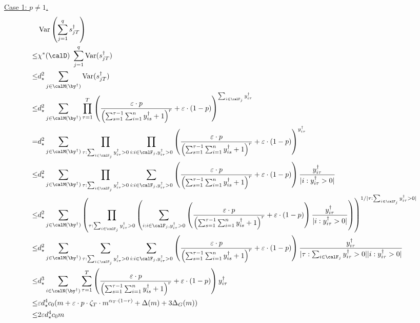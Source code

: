\documentclass[blindrev]{informs3noheader}
\DeclareMathOperator{\Var}{Var}
\begin{document}
\underline{Case 1: $p\neq 1$.}
\begin{align*}
&\Var\left(\sum_{j=1}^q s^\dagger_{jT}\right)
\\\leq & \chi^*(\calD)\ \sum_{j=1}^q \Var(s^\dagger_{jT})
\\\leq & d_\star^2 \sum_{j \in \calM(\by^\dagger)} \Var(s^\dagger_{jT})
\\\leq & d_\star^2\sum_{j \in \calM(\by^\dagger)}  \prod_{\tau=1}^T \left(\frac{\varepsilon\cdot p}{\left(\sum_{s=1}^{\tau-1} \sum_{i=1}^n y^\dagger_{is} + 1\right)^r}+\varepsilon\cdot(1-p)\right)^{\sum_{i \in \calF_j} y^\dagger_{i\tau}}
\\= & d_\star^2\sum_{j \in \calM(\by^\dagger)}  \prod_{\tau:\sum_{i \in \calF_j} y^\dagger_{i\tau}>0 }  \prod_{i:i \in \calF_j, y^\dagger_{i\tau}>0 }  \left(\frac{\varepsilon\cdot p}{\left(\sum_{s=1}^{\tau-1} \sum_{i=1}^n y^\dagger_{is} + 1\right)^r}+\varepsilon\cdot(1-p)\right)^{ y^\dagger_{i\tau}}    
\\\leq & d_\star^2\sum_{j \in \calM(\by^\dagger)}  \prod_{\tau:\sum_{i \in \calF_j} y^\dagger_{i\tau}>0 } \sum_{i: i \in \calF_j,  y^\dagger_{i\tau}>0} \left(\frac{\varepsilon\cdot p}{\left(\sum_{s=1}^{\tau-1} \sum_{i=1}^n y^\dagger_{is} + 1\right)^r}+\varepsilon\cdot(1-p)\right)\frac{y^\dagger_{i\tau}}{|i:  y^\dagger_{i\tau}>0|}
\\\leq & d_\star^2\sum_{j \in \calM(\by^\dagger)}  \left(\prod_{\tau:\sum_{i \in \calF_j} y^\dagger_{i\tau}>0 } \left(\sum_{i: i \in \calF_j,  y^\dagger_{i\tau}>0} \left(\frac{\varepsilon\cdot p}{\left(\sum_{s=1}^{\tau-1} \sum_{i=1}^n y^\dagger_{is} + 1\right)^r}+\varepsilon\cdot(1-p)\right)\frac{y^\dagger_{i\tau}}{|i:  y^\dagger_{i\tau}>0|}\right)\right)^{1/|\tau:\sum_{i \in \calF_j} y^\dagger_{i\tau}>0 |}
\\\leq & d_\star^2\sum_{j \in \calM(\by^\dagger)}  \sum_{\tau:\sum_{i \in \calF_j} y^\dagger_{i\tau}>0 }\sum_{i: i \in \calF_j,  y^\dagger_{i\tau}>0}\left(\frac{\varepsilon\cdot p}{\left(\sum_{s=1}^{\tau-1} \sum_{i=1}^n y^\dagger_{is} + 1\right)^r}+\varepsilon\cdot(1-p)\right)\frac{y^\dagger_{i\tau}}{|\tau:\sum_{i \in \calF_j} y^\dagger_{i\tau}>0 ||i:  y^\dagger_{i\tau}>0|}    
\\\leq & d_\star^3\sum_{i \in \calN(\by^\dagger)} \sum_{\tau=1}^T \left(\frac{\varepsilon\cdot p}{\left(\sum_{s=1}^{\tau-1} \sum_{i=1}^n y^\dagger_{is} + 1\right)^r}+\varepsilon\cdot(1-p)\right)y^\dagger_{i\tau}
\\\leq & \varepsilon d_\star^4 c_0 (m + \varepsilon \cdot p \cdot \zeta_T \cdot m^{\alpha_T \cdot(1-r)} + \Delta(m)+3\Delta_G(m))
\\\leq& 2\varepsilon d_\star^4 c_0 m
\end{align*}
\end{document}
